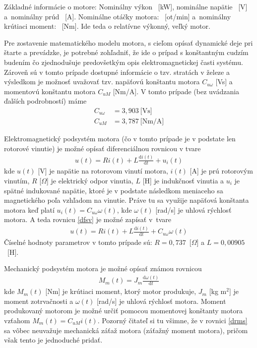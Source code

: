 \documentclass[a4paper, 10pt, ]{article}
\begin{document}
Základné informácie o motore: Nominálny výkon ~[kW], nominálne napätie ~[V] a~nominálny prúd ~[A]. Nominálne otáčky motora: ~[ot/min] a~nominálny krútiaci moment: ~[Nm]. Ide teda o relatívne výkonný, veľký motor.

Pre zostavenie matematického modelu motora, s cieľom opísať dynamické deje pri štarte a prevádzke, je potrebné zohľadniť, že ide o prípad s konštantným cudzím budením čo zjednodušuje predovšetkým opis elektromagnetickej časti systému. Zároveň sú v tomto prípade dostupné informácie o tzv. stratách v železe a výsledkom je možnosť uvažovať tzv. napäťovú konštantu motora $C_{u\omega}$ [Vs] a momentovú konštantu motora $C_{uM}$ [Nm/A]. V tomto prípade (bez uvádzania ďalších podrobností) máme
\begin{subequations}
	\begin{align}
		C_{u\omega} &= 3,903\ \text{[Vs]}\\
		C_{uM} &= 3,787\ \text{[Nm/A]}
	\end{align}
\end{subequations}


Elektromagnetický podsystém motora (čo v tomto prípade je v podstate len rotorové vinutie) je možné opísať diferenciálnou rovnicou v tvare
\begin{align} \label{dfsv}
	u(t) = R i(t) + L \frac{\text{d}i(t)}{\text{d}t} + u_i(t)
\end{align}
kde $u(t)$ [V] je napätie na rotorovom vinutí motora, $i(t)$ [A] je prú rotorovým vinutím, $R$ [$\Omega$] je elektrický odpor vinutia, $L$ [H] je indukčnosť vinutia a $u_i$ je spätné indukované napätie, ktoré je v podstate následkom meniaceho sa magnetického poľa vzhľadom na vinutie. Práve tu sa využije napäťová konštanta motora keď platí $u_i(t) = C_{u\omega} \omega(t)$, kde $\omega(t)$ [rad/s] je uhlová rýchlosť motora. A teda rovnicu \eqref{dfsv} je možné zapísať v~tvare
\begin{align} \label{dfsv2}
	u(t) = R i(t) + L \frac{\text{d}i(t)}{\text{d}t} + C_{u\omega} \omega(t)
\end{align}
Číselné hodnoty parametrov v tomto prípade sú: $R = 0,737$~[$\Omega$] a $L = 0,00905$~[H].



Mechanický podsystém motora je možné opísať známou rovnicou
\begin{align} \label{drms}
	M_m(t) = J_m \frac{\text{d}\omega(t)}{\text{d}t}
\end{align}
kde $M_m(t)$ [Nm] je krútiaci moment, ktorý motor produkuje, $J_m$ [kg m${}^2$] je moment zotrvačnosti a $\omega(t)$ [rad/s] je uhlová rýchlosť motora. Moment produkovaný motorom je možné určiť pomocou momentovej konštanty motora vzťahom $M_m(t) = C_{uM} i(t)$. Pozorný čitateľ si tu všimne, že v rovnici \eqref{drms} sa vôbec neuvažuje mechanická záťaž motora (záťažný moment motora), pričom však tento je jednoduché pridať.
\end{document}
